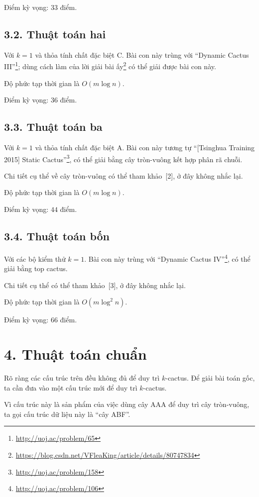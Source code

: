 \documentclass[11pt]{article}
\begin{document}
Điểm kỳ vọng: \(33\) điểm.

\subsection*{3.2. Thuật toán hai}

Với \(k=1\) và thỏa tính chất đặc biệt C. Bài con này trùng với ``Dynamic
Cactus III''\footnote{\url{http://uoj.ac/problem/65}}; dùng cách làm của lời
giải bài ấy\footnote{\url{https://blog.csdn.net/VFleaKing/article/details/80747834}}
có thể giải được bài con này.

Độ phức tạp thời gian là \(O(m\log n)\).

Điểm kỳ vọng: \(36\) điểm.

\subsection*{3.3. Thuật toán ba}

Với \(k=1\) và thỏa tính chất đặc biệt A. Bài con này tương tự
``[Tsinghua Training 2015] Static Cactus''\footnote{\url{http://uoj.ac/problem/158}},
có thể giải bằng cây tròn-vuông kết hợp phân rã chuỗi.

Chi tiết cụ thể về cây tròn-vuông có thể tham khảo~[2], ở đây không nhắc lại.

Độ phức tạp thời gian là \(O(m\log n)\).

Điểm kỳ vọng: \(44\) điểm.

\subsection*{3.4. Thuật toán bốn}

Với các bộ kiểm thử \(k=1\). Bài con này trùng với ``Dynamic Cactus
IV''\footnote{\url{http://uoj.ac/problem/106}}, có thể giải bằng top cactus.

Chi tiết cụ thể có thể tham khảo~[3], ở đây không nhắc lại.

Độ phức tạp thời gian là \(O(m\log^2 n)\).

Điểm kỳ vọng: \(66\) điểm.

\section*{4. Thuật toán chuẩn}

Rõ ràng các cấu trúc trên đều không đủ để duy trì \(k\)-cactus. Để giải bài
toán gốc, ta cần đưa vào một cấu trúc mới để duy trì \(k\)-cactus.

Vì cấu trúc này là sản phẩm của việc dùng cây AAA để duy trì cây tròn-vuông,
ta gọi cấu trúc dữ liệu này là ``cây ABF''.
\end{document}
